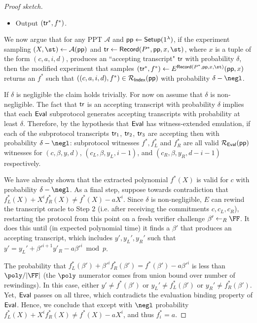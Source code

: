 \begin{proof}[Proof sketch]
\begin{itemize}
\item Output $(\textsf{{tr}}^*, f^*)$.  
\end{itemize}

We now argue that for any PPT $\mathcal{A}$ and $\textsf{pp} \leftarrow \textsf{{Setup}}(1^\lambda)$, if the experiment sampling $(X, \st) \leftarrow \mathcal{A}(\params)$ and $\tr \leftarrow \pro{Record}(P^*, \params, x, \st)$, where $x$ is a tuple of the form $(c, a, i, d)$, produces an ``accepting transcript" $\textsf{{tr}}$ with probability $\delta$, then the modified experiment that samples $(\tr^*, f^*) \leftarrow E^{\textsf{Record}(P^*, \params, x, \st)}(\params, x)$ returns an $f^*$ such that $((c, a, i, d), f^*) \in \mathcal{R_\textsf{Index}}(\textsf{pp})$ with probability $\delta - \negl$. 

If $\delta$ is negligible the claim holds trivially. For now on assume that $\delta$ is non-negligible. 
The fact that $\textsf{{tr}}$ is an accepting transcript with probability $\delta$ implies that each $\textsf{{Eval}}$ subprotocol generates accepting transcripts with probability at least $\delta$. Therefore, by the hypothesis that $\textsf{{Eval}}$ has witness-extended emulation, if each of the subprotocol transcripts $\textsf{{tr}}_1$, $\textsf{{tr}}_2$, $\textsf{{tr}}_3$ are accepting then with probability $\delta - \negl$: subprotocol witnesses $f^*, f_L^*$ and $f_R^*$ are all valid $\mathcal{R_\textsf{Eval}}(\textsf{pp})$ witnesses for $(c, \beta, y, d)$, $(c_L, \beta, y_L, i-1)$, and $(c_R, \beta, y_R, d - i - 1)$ respectively. 

We have already shown that the extracted polynomial $f^*(X)$ is valid for $c$ with probability $\delta - \negl$. As a final step, suppose towards contradiction that $f_L^*(X) + X^i f_R^*(X) \neq f^*(X) - a X^i$. Since $\delta$ is non-negligible, $E$ can rewind the transcript oracle to Step 2 (i.e. after receiving the commitments $c, c_L, c_R$), restarting the protocol from this point on a fresh verifier challenge $\beta' \leftarrow_R \FF$. It does this until (in expected polynomial time) it finds a $\beta'$ that produces an accepting transcript, which includes $y', y_L', y_R'$ such that $y' = y_L' + \beta'^{i+1} y'_R - a \beta'^i \bmod p$.

The probability that $f_L^*(\beta') + \beta'^i f_R^*(\beta') = f^*(\beta') - a \beta'^i$ is less than $\poly / |\FF|$ (the $\poly$ numerator comes from union bound over number of rewindings). In this case, either $y' \neq f^*(\beta')$ or $y_L' \neq f^*_L(\beta')$ or $y_R' \neq f^*_R(\beta')$. Yet, $\textsf{{Eval}}$ passes on all three, which contradicts the evaluation binding property of $\textsf{{Eval}}$. Hence, we conclude that except with $\negl$ probability $f_L^*(X) + X^i f_R^*(X) \neq f^*(X) - a X^i$, and thus $f^*_i = a$. 

\end{proof}
\fi 



